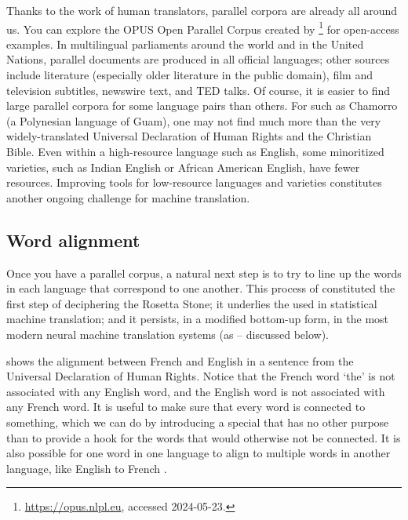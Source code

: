 Thanks to the work of human translators, parallel corpora are already all around us.  You can explore the OPUS Open Parallel Corpus created by \citet{TiedemannNygaard:2004}\footnote{\url{https://opus.nlpl.eu}, accessed 2024-05-23.} for open-access examples.  In multilingual parliaments around the world and in the United Nations, parallel documents are produced in all official languages; other sources include literature (especially older literature in the public domain), film and television subtitles, newswire text, and TED talks.  Of course, it is easier to find large parallel corpora for some language pairs than others.   For  such as Chamorro (a Polynesian language of Guam), one may not find much more than the very widely-translated Universal Declaration of Human Rights and the Christian Bible.   Even within a high-resource language such as English, some minoritized varieties, such as Indian English or African American English, have fewer resources. 
Improving tools for low-resource languages and varieties constitutes another ongoing challenge for machine translation.


\subsection{Word alignment} \label{sec:word-alignment}

Once you have a parallel corpus, a natural next step is to try to line up the words in each language that correspond to one another.  This process of  constituted the first step of deciphering the  Rosetta Stone; it underlies the  used in statistical machine translation; and it persists, in a modified bottom-up form,  in the most modern neural machine translation systems (as  -- discussed below).


 shows the alignment between French and English in a sentence from the Universal Declaration of Human Rights.  Notice that the French word  `the' is not associated with any English word, and the English word  is not associated with any French word. It is useful to make sure that
every word is connected to something, which we can do by introducing a
special  that has no other purpose than to provide
a hook for the words that would otherwise not be connected.  It is also possible for one word in one language to align to multiple words in another language, like English  to French .

